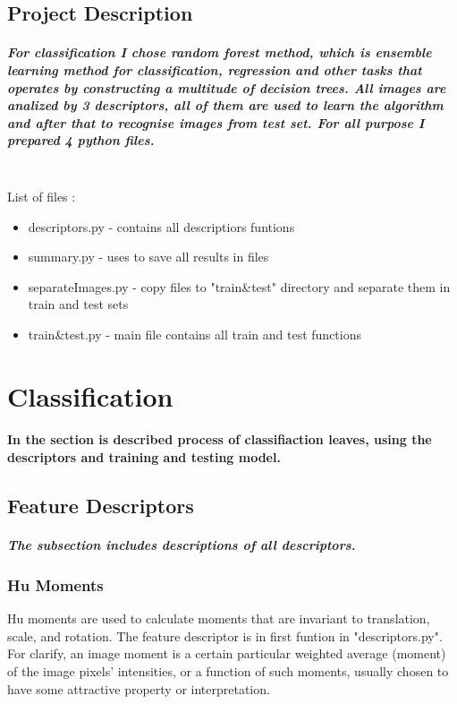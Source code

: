 \documentclass[12pt]{article}
\begin{document}
\subsection{Project Description}

\subparagraph{
For classification I chose random forest method, which is ensemble learning method for classification, regression and other tasks that operates by constructing a multitude of decision trees. All images are analized by 3 descriptors, all of them are used to learn the algorithm and after that to recognise images from test set. For all purpose I prepared 4 python files.\\\\
}

List of files :
\begin{itemize}
\item descriptors.py - contains all descriptiors funtions
\item summary.py - uses to save all results in files
\item separateImages.py - copy files to "train\&test" directory and separate them in train and test sets
\item train\&test.py - main file contains all train and test functions
\end{itemize}

\section{Classification}

\paragraph{
In the section is described process of classifiaction leaves, using the descriptors and training and testing model.
}

\subsection{Feature Descriptors}

\subparagraph{
The subsection includes descriptions of all descriptors.
}

\subsubsection{Hu Moments}

Hu moments are used to calculate moments that are invariant to translation, scale, and rotation. The feature descriptor is in first funtion in "descriptors.py". For clarify, an image moment is a certain particular weighted average (moment) of the image pixels' intensities, or a function of such moments, usually chosen to have some attractive property or interpretation.
\end{document}
